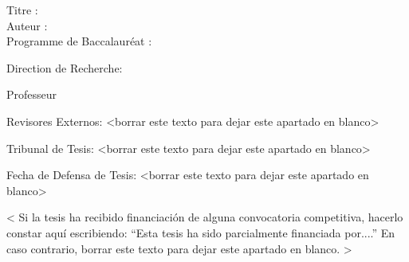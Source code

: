 
\begin{spacing}{1.3}
Titre : \thesisTitle \\
Auteur : \thesisAuthor\\
Programme de Baccalauréat :	\BachelorProgramme
\end{spacing}

Direction de Recherche: 
\begin{mydescription}
    \item Professeur \thesisTeacher{} 
\end{mydescription}

\vspace{30 mm}
Revisores Externos: <borrar este texto para dejar este apartado en blanco>

\vspace{30 mm}

Tribunal de Tesis: <borrar este texto para dejar este apartado en blanco>


\vspace{50mm}



Fecha de Defensa de Tesis: <borrar este texto para dejar este apartado en blanco>



\vspace{\fill}
\begin{spacing}{1.0}
< Si la tesis ha recibido financiación de alguna convocatoria competitiva, hacerlo constar aquí  escribiendo: “Esta tesis ha sido parcialmente financiada por....” En caso contrario,  borrar este texto para dejar este apartado en blanco. >
\end{spacing}


